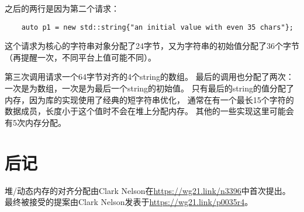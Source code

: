 之后的两行是因为第二个请求：
\begin{lstlisting}
    auto p1 = new std::string{"an initial value with even 35 chars"};
\end{lstlisting}
这个请求为核心的字符串对象分配了24字节，又为字符串的初始值分配了36个字节
（再提醒一次，不同平台上值可能不同）。

第三次调用请求一个64字节对齐的4个string的数组。
最后的调用也分配了两次：一次是为数组，一次是为最后一个string的初始值。
只有最后的string的值分配了内存，因为库的实现使用了经典的短字符串优化，
通常在有一个最长15个字符的数据成员，长度小于这个值时不会在堆上分配内存。
其他的一些实现这里可能会有5次内存分配。


\section{后记}
堆/动态内存的对齐分配由Clark Nelson在\url{https://wg21.link/n3396}中首次提出。
最终被接受的提案由Clark Nelson发表于\url{https://wg21.link/p0035r4}。